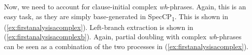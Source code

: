 \noindent Now, we need to account for clause-initial complex \textit{wh}-phrases. Again, this is an easy task, as they are simply base-generated in SpecCP\textsubscript{1}. This is shown in (\ref{ex:firstanalysisacomplex}). Left-branch extraction is shown in (\ref{ex:firstanalysisacomplexb}). Again, partial doubling with complex \textit{wh}-phrases can be seen as a combination of the two processes in (\ref{ex:firstanalysisacomplex}).
\begin{exe}
\ex\label{ex:firstanalysisacomplex}
\begin{multicols}{2}
\begin{xlist}
\ex \label{ex:firstanalysisacomplexa}
\begin{adjustbox}{max width=0.46\textwidth}
\end{adjustbox}
\end{xlist}
\end{multicols}
\end{exe}
